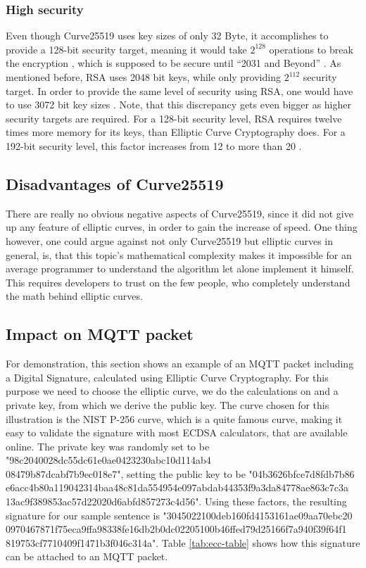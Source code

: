 \subsubsection{High security}
Even though Curve25519 uses key sizes of only 32 Byte, it accomplishes to provide a 128-bit security target, meaning it would take $ 2^{128} $ operations to break the encryption \cite{SecLevel}, which is supposed to be secure until “2031 and Beyond” \cite{KeySize}. As mentioned before, RSA uses 2048 bit keys, while only providing $ 2^{112} $ security target. In order to provide the same level of security using RSA, one would have to use 3072 bit key sizes \cite{KeySize}. Note, that this discrepancy gets even bigger as higher security targets are required. For a 128-bit security level, RSA requires twelve times more memory for its keys, than Elliptic Curve Cryptography does. For a 192-bit security level, this factor increases from 12 to more than 20 \cite{SecLevelInc}.

\subsection{Disadvantages of Curve25519}
There are really no obvious negative aspects of Curve25519, since it did not give up any feature of elliptic curves, in order to gain the increase of speed. One thing however, one could argue against not only Curve25519 but elliptic curves in general, is, that this topic's mathematical complexity makes it impossible for an average programmer to understand the algorithm let alone implement it himself. This requires developers to trust on the few people, who completely understand the math behind elliptic curves.

\newpage

\subsection{Impact on MQTT packet}
For demonstration, this section shows an example of an MQTT packet including a Digital Signature, calculated using Elliptic Curve Cryptography. For this purpose we need to choose the elliptic curve, we do the calculations on and a private key, from which we derive the public key. The curve chosen for this illustration is the NIST P-256 curve, which is a quite famous curve, making it easy to validate the signature with most ECDSA calculators, that are available online. The private key was randomly set to be "98c2040028dc55dc61e0ae0423230abc10d114ab4\\08479b87dcabf7b9ec018e7", setting the public key to be "04b3626bfce7d8fdb7b86\\e6acc4b80a119042314baa48c81da554954e097abdab44353f9a3da84778ae863c7c3a\\13ac9f389853ac57d22020d6abfd857273c4d56".
Using these factors, the resulting signature for our sample sentence is "3045022100deb160fd4153161ae09aa70ebc20\\0970467871f75eca9ffa98338fe16db2b0dc02205100b46ffed79d25166f7a940f39f64f1\\819753cf7710409f1471b3f046c314a". Table \ref{tab:ecc-table} shows how this signature can be attached to an MQTT packet.

